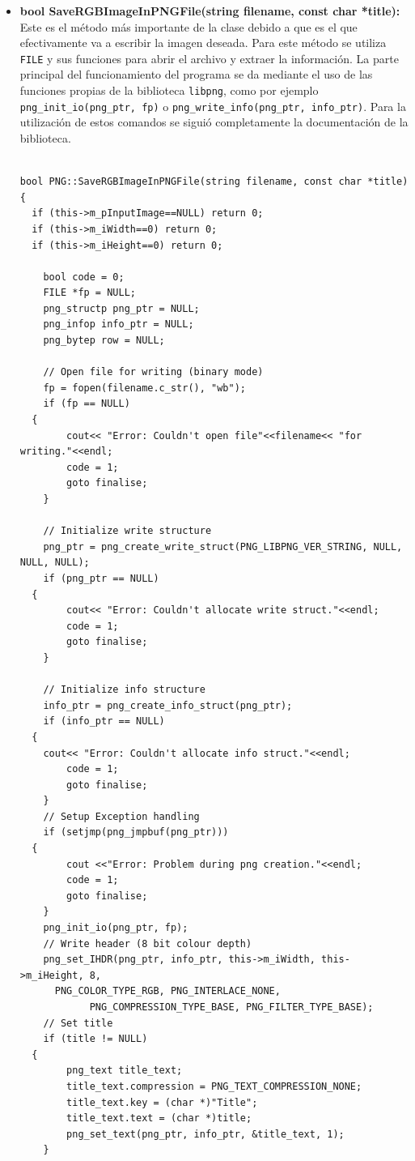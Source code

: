 \begin{itemize}
    \item \textbf{bool SaveRGBImageInPNGFile(string filename, const char *title):} Este es el método más importante de la clase debido a que es el que efectivamente va a escribir la imagen deseada. Para este método se utiliza \texttt{FILE} y sus funciones para abrir el archivo y extraer la información. La parte principal del funcionamiento del programa se da mediante el uso de las funciones propias de la biblioteca \texttt{libpng}, como por ejemplo \texttt{png\_init\_io(png\_ptr, fp)} o \texttt{png\_write\_info(png\_ptr, info\_ptr)}. Para la utilización de estos comandos se siguió completamente la documentación de la biblioteca. 
    
     \begin{verbatim}
     
bool PNG::SaveRGBImageInPNGFile(string filename, const char *title)
{
  if (this->m_pInputImage==NULL) return 0;
  if (this->m_iWidth==0) return 0;
  if (this->m_iHeight==0) return 0;

	bool code = 0;
	FILE *fp = NULL;
	png_structp png_ptr = NULL;
	png_infop info_ptr = NULL;
	png_bytep row = NULL;

	// Open file for writing (binary mode)
	fp = fopen(filename.c_str(), "wb");
	if (fp == NULL)
  {
		cout<< "Error: Couldn't open file"<<filename<< "for writing."<<endl;
		code = 1;
		goto finalise;
	}

	// Initialize write structure
	png_ptr = png_create_write_struct(PNG_LIBPNG_VER_STRING, NULL, NULL, NULL);
	if (png_ptr == NULL)
  {
		cout<< "Error: Couldn't allocate write struct."<<endl;
		code = 1;
		goto finalise;
	}

	// Initialize info structure
	info_ptr = png_create_info_struct(png_ptr);
	if (info_ptr == NULL)
  {
    cout<< "Error: Couldn't allocate info struct."<<endl;
		code = 1;
		goto finalise;
	}
	// Setup Exception handling
	if (setjmp(png_jmpbuf(png_ptr)))
  {
		cout <<"Error: Problem during png creation."<<endl;
		code = 1;
		goto finalise;
	}
	png_init_io(png_ptr, fp);
	// Write header (8 bit colour depth)
	png_set_IHDR(png_ptr, info_ptr, this->m_iWidth, this->m_iHeight, 8,
      PNG_COLOR_TYPE_RGB, PNG_INTERLACE_NONE,
			PNG_COMPRESSION_TYPE_BASE, PNG_FILTER_TYPE_BASE);
	// Set title
	if (title != NULL)
  {
		png_text title_text;
		title_text.compression = PNG_TEXT_COMPRESSION_NONE;
		title_text.key = (char *)"Title";
		title_text.text = (char *)title;
		png_set_text(png_ptr, info_ptr, &title_text, 1);
	}


\end{verbatim}
\end{itemize}
